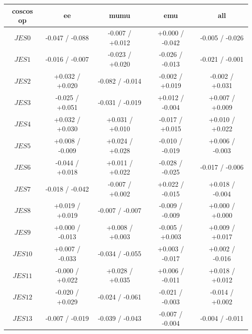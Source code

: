  \begin{table}[htbp]
\footnotesize
   \begin{center}
   \begin{tabular}{|c|c|c|c|c|}
   \hline
     \textbf{coscos op}        &  ee &mumu &emu&all\\
   \hline
   $JES 0$                             &  -0.047   / -0.088   & -0.007   / +0.012   & +0.000   / -0.042   & -0.005   / -0.026   \\
   $JES 1$                             &  -0.016   / -0.007   & -0.023   / +0.020   & -0.026   / -0.013   & -0.021   / -0.001   \\
   $JES 2$                             &  +0.032   / +0.020   & -0.082   / -0.014   & -0.002   / +0.019   & -0.002   / +0.031   \\
   $JES 3$                             &  -0.025   / +0.051   & -0.031   / -0.019   & +0.012   / -0.004   & +0.007   / +0.009   \\
   $JES 4$                             &  +0.032   / +0.030   & +0.031   / +0.010   & -0.017   / +0.015   & +0.010   / +0.022   \\
   $JES 5$                             &  +0.008   / -0.009   & +0.024   / +0.028   & -0.010   / -0.019   & +0.006   / -0.003   \\
   $JES 6$                             &  -0.044   / +0.018   & +0.011   / +0.022   & -0.028   / -0.025   & -0.017   / -0.006   \\
   $JES 7$                             &  -0.018   / -0.042   & -0.007   / +0.002   & +0.022   / -0.015   & +0.018   / -0.004   \\
   $JES 8$                             &  +0.019   / +0.019   & -0.007   / -0.007   & -0.009   / -0.009   & +0.000   / +0.000   \\
   $JES 9$                             &  +0.000   / -0.013   & +0.008   / +0.003   & -0.005   / +0.003   & +0.009   / +0.017   \\
   $JES {10}$                          &  +0.007   / -0.033   & -0.034   / -0.055   & +0.003   / -0.017   & +0.002   / -0.016   \\
   $JES {11}$                          &  -0.000   / +0.022   & +0.028   / +0.035   & +0.006   / -0.011   & +0.018   / +0.012   \\
   $JES {12}$                          &  -0.020   / +0.029   & -0.024   / -0.061   & -0.021   / -0.003   & -0.014   / +0.002   \\
   $JES {13}$                          &  -0.007   / -0.019   & -0.039   / -0.043   & -0.007   / -0.004   & -0.004   / -0.011   \\

\end{tabular}
\end{center}
\end{table}
